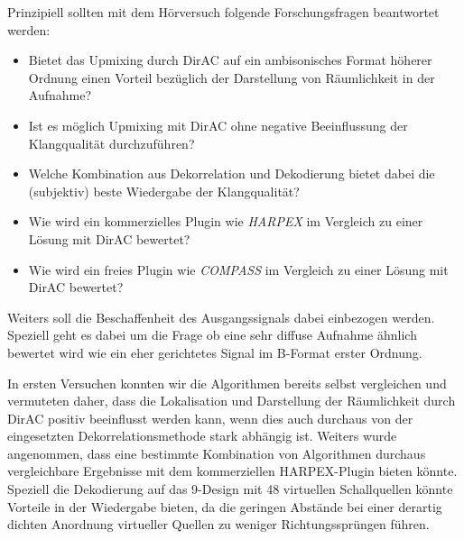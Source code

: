 Prinzipiell sollten mit dem Hörversuch folgende Forschungsfragen beantwortet werden:

\begin{itemize}
	\item Bietet das Upmixing durch DirAC auf ein ambisonisches Format höherer Ordnung einen Vorteil bezüglich der Darstellung von Räumlichkeit in der Aufnahme?
	\item Ist es möglich Upmixing mit DirAC ohne negative Beeinflussung der Klangqualität durchzuführen?
	\item Welche Kombination aus Dekorrelation und Dekodierung bietet dabei die (subjektiv) beste Wiedergabe der Klangqualität?
	\item Wie wird ein kommerzielles Plugin wie \textit{HARPEX} im Vergleich zu einer Lösung mit DirAC bewertet?
	\item Wie wird ein freies Plugin wie \textit{COMPASS} im Vergleich zu einer Lösung mit DirAC bewertet?
\end{itemize}

Weiters soll die Beschaffenheit des Ausgangssignals dabei einbezogen werden. Speziell geht es dabei um die Frage ob eine sehr diffuse Aufnahme ähnlich bewertet wird wie ein eher gerichtetes Signal im B-Format erster Ordnung.

In ersten Versuchen konnten wir die Algorithmen bereits selbst vergleichen und vermuteten daher, dass die Lokalisation und Darstellung der Räumlichkeit durch DirAC positiv beeinflusst werden kann, wenn dies auch durchaus von der eingesetzten Dekorrelationsmethode stark abhängig ist. Weiters wurde angenommen, dass eine bestimmte Kombination von Algorithmen durchaus vergleichbare Ergebnisse mit dem kommerziellen HARPEX-Plugin bieten könnte. Speziell die Dekodierung auf das 9-Design mit 48 virtuellen Schallquellen könnte Vorteile in der Wiedergabe bieten, da die geringen Abstände bei einer derartig dichten Anordnung virtueller Quellen zu weniger Richtungssprüngen führen.
